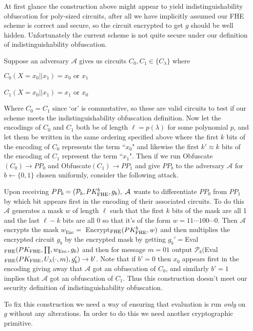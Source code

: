 \documentclass[12pt,twoside]{reedthesis}
\newcommand{\enc}[0]{\text{Enc}}
\begin{document}
    
    \par At first glance the construction above might appear to yield indistinguishability obfuscation for poly-sized circuits, after all we have implicitly assumed our FHE scheme is correct and secure, so the circuit encrypted to get $g$ should be well hidden. Unfortunately the current scheme is not quite secure under our definition of indistinguishability obfuscation. 
    \par Suppose an adversary $\mathcal{A}$ gives us circuits $C_0,C_1 \in \{ C_\lambda\}$ where 
   \begin{center}
    $C_0(X = x_0||x_1) = x_0 \text{ or } x_1$\\
     \\
   $C_1(X =x_0||x_1) = x_1 \text{ or } x_0$
    \end{center}
    Where $C_0 = C_1$ since `or' is commutative, so these are valid circuits to test if our scheme meets the indistinguishability obfuscation definition. Now let the encodings of $C_0$ and $C_1$ both be of length $\ell = p(\lambda)$ for some polynomial $p$, and let them be written in the same ordering specified above where the first $k$ bits of the encoding of $C_0$ represents the term ``$x_0$" and likewise the first $k' \approx k$ bits of the encoding of $C_1$ represent the term ``$x_1$". Then if we run Obfuscate$(C_0)\to PP_0$ and Obfuscate$(C_1) \to PP_1$ and give $PP_b$ to the adversary $\mathcal{A}$ for $b \leftarrow \{0,1\}$ chosen uniformly, consider the following attack.
    \par Upon receiving $PP_b =(\mathcal{P}_b,PK_\text{FHE}^b,g_b),\; \mathcal{A}$ wants to differentiate $PP_0$ from $PP_1$ by which bit appears first in the encoding of their associated circuits. To do this $\mathcal{A}$ generates a mask $w$ of length $\ell$ such that the first $k$ bits of the mask are all 1 and the last $\ell - k$ bits are all 0 so that it's of the form $w = 11\cdots 100 \cdots 0$. Then $\mathcal{A}$ encrypts the mask $w_\enc =$ Encrypt$_\text{FHE}(PK_\text{FHE}^b, w)$ and then multiplies the encrypted circuit $g_b$ by the encrypted mask by getting $g_b' =$Eval$\fhe(PK\fhe,\prod,w_\enc,g_b)$ and then for message $m=01$ output $\mathcal{P}_b($Eval$_\text{FHE}(PK_\text{FHE},U_\lambda(\cdot,m),g_b')\to b'$. Note that if $b' = 0$ then $x_0$ appears first in the encoding giving away that $\mathcal{A}$ got an obfuscation of $C_0$, and similarly $b'=1$ implies that $\mathcal{A}$ got an obfuscation of $C_1$. Thus this construction doesn't meet our security definition of indistinguishability obfuscation.
       \par To fix this construction we need a way of ensuring that evaluation is run \textit{only} on $g$ without any alterations. In order to do this we need another cryptographic primitive.
       
\end{document}
